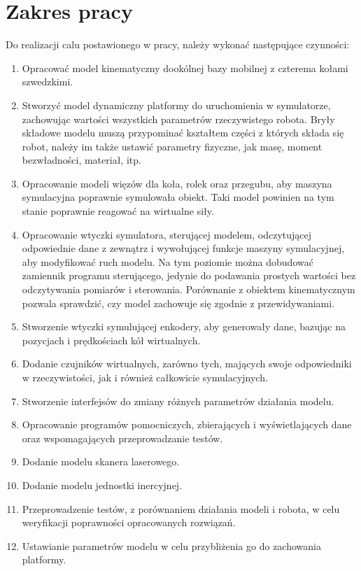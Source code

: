\section{Zakres pracy}
	Do realizacji calu postawionego w pracy, należy wykonać następujące czynności:
	\begin{enumerate}
	\item Opracować model kinematyczny dookólnej bazy mobilnej z czterema kołami szwedzkimi.
	\item Stworzyć model dynamiczny platformy do uruchomienia w symulatorze, zachowując wartości wszystkich parametrów rzeczywistego robota.
	Bryły składowe modelu muszą przypominać kształtem części z których składa się robot, należy im także ustawić parametry fizyczne, jak masę, moment bezwładności, materiał, itp.
	\item Opracowanie modeli więzów dla koła, rolek oraz przegubu, aby maszyna symulacyjna poprawnie symulowała obiekt.
	Taki model powinien na tym stanie poprawnie reagować na wirtualne siły.
	\item Opracowanie wtyczki symulatora, sterującej modelem, odczytującej odpowiednie dane z zewnątrz i wywołującej funkcje maszyny symulacyjnej, aby modyfikować ruch modelu.
	Na tym poziomie można dobudować zamiennik programu sterującego, jedynie do podawania prostych wartości bez odczytywania pomiarów i sterowania.
	Porównanie z obiektem kinematycznym pozwala sprawdzić, czy model zachowuje się zgodnie z przewidywaniami.
	\item Stworzenie wtyczki symulującej enkodery, aby generowały dane, bazując na pozycjach i prędkościach kół wirtualnych.
	\item Dodanie czujników wirtualnych, zarówno tych, mających swoje odpowiedniki w rzeczywistości, jak i również całkowicie symulacyjnych.
	\item Stworzenie interfejsów do zmiany różnych parametrów działania modelu.
	\item Opracowanie programów pomocniczych, zbierających i wyświetlających dane oraz wspomagających przeprowadzanie testów.
	\item Dodanie modelu skanera laserowego.
	\item Dodanie modelu jednostki inercyjnej.
	\item Przeprowadzenie testów, z porównaniem działania modeli i robota, w celu weryfikacji poprawności opracowanych rozwiązań.
	\item Ustawianie parametrów modelu w celu przybliżenia go do zachowania platformy.
	\end{enumerate}
	

